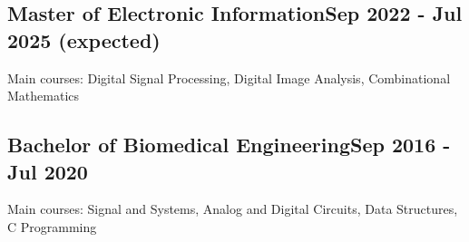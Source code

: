 \vspace*{10pt}
\subsection {{Master of Electronic Information}\hfill Sep 2022 - Jul 2025 (expected)}
\vspace*{5pt}
Main courses: Digital Signal Processing, Digital Image Analysis, Combinational Mathematics

\vspace*{6pt}
\subsection{{Bachelor of Biomedical Engineering}\hfill Sep 2016 - Jul 2020}
\vspace*{5pt}
Main courses: Signal and Systems, Analog and Digital Circuits, Data Structures, C Programming
